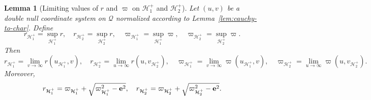 \documentclass[10pt, reqno]{amsart}
\newtheorem{lemma}[theorem]{Lemma}
\theoremstyle{definition}
\theoremstyle{remark}
\numberwithin{equation}{section}
\newcommand{\0}{\emptyset}
\newcommand{\bfe}{{\bf e}}
\newcommand{\calH}{\mathcal H}
\newcommand{\calQ}{\mathcal Q}
\newcommand{\EH}{\calH^{+}}
\newcommand{\e}{\bfe}							%
\begin{document}
\begin{lemma}[Limiting values of $r$ and $\varpi$ on $\EH_1$ and $\EH_2$]
Let $(u, v)$ be a double null coordinate system on $\calQ$ normalized according to Lemma~\ref{lem:cauchy-to-char}.
Define
$$r_{\EH_1}=\sup_{\EH_1} r,\quad r_{\EH_2}=\sup_{\EH_2} r,\quad \varpi_{\EH_1}=\sup_{\EH_1} \varpi,\quad \varpi_{\EH_2}=\sup_{\EH_2} \varpi.$$
Then 
\begin{equation}\label{r.varpi.limits}
r_{\EH_1}=\lim_{v\to\infty} r(u_{\EH_1}, v),\quad r_{\EH_2}=\lim_{u\to \infty} r(u,v_{\EH_2}),\quad \varpi_{\EH_1}=\lim_{v\to\infty} \varpi(u_{\EH_1}, v),\quad \varpi_{\EH_2}=\lim_{u\to \infty} \varpi(u,v_{\EH_2}).
\end{equation}
Moreover,
\begin{equation}\label{r.varpi.poly}
r_{\EH_1}=\varpi_{\EH_1} +\sqrt{\varpi_{\EH_1}^2-\e^2},\quad r_{\EH_2}=\varpi_{\EH_2} +\sqrt{\varpi_{\EH_2}^2-\e^2}.
\end{equation}
\end{lemma}
\end{document}
